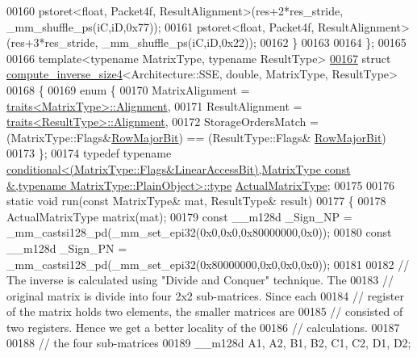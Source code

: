 \begin{DoxyCode}
00160     pstoret<float, Packet4f, ResultAlignment>(res+2*res\_stride, \_mm\_shuffle\_ps(iC,iD,0x77));
00161     pstoret<float, Packet4f, ResultAlignment>(res+3*res\_stride, \_mm\_shuffle\_ps(iC,iD,0x22));
00162   \}
00163 
00164 \};
00165 
00166 \textcolor{keyword}{template}<\textcolor{keyword}{typename} MatrixType, \textcolor{keyword}{typename} ResultType>
\hyperlink{struct_eigen_1_1internal_1_1compute__inverse__size4_3_01_architecture_1_1_s_s_e_00_01double_00_0ae07abd87bb6c7ddc3170cf276579ed0}{00167} \textcolor{keyword}{struct }\hyperlink{struct_eigen_1_1internal_1_1compute__inverse__size4}{compute\_inverse\_size4}<Architecture::SSE, double, MatrixType, ResultType>
00168 \{
00169   \textcolor{keyword}{enum} \{
00170     MatrixAlignment     = \hyperlink{struct_eigen_1_1internal_1_1traits}{traits<MatrixType>::Alignment},
00171     ResultAlignment     = \hyperlink{struct_eigen_1_1internal_1_1traits}{traits<ResultType>::Alignment},
00172     StorageOrdersMatch  = (MatrixType::Flags&\hyperlink{group__flags_gae4f56c2a60bbe4bd2e44c5b19cbe8762}{RowMajorBit}) == (ResultType::Flags&
      \hyperlink{group__flags_gae4f56c2a60bbe4bd2e44c5b19cbe8762}{RowMajorBit})
00173   \};
00174   \textcolor{keyword}{typedef} \textcolor{keyword}{typename} 
      \hyperlink{class_eigen_1_1internal_1_1_tensor_lazy_evaluator_writable}{conditional<(MatrixType::Flags&LinearAccessBit),MatrixType const &,typename MatrixType::PlainObject>::type}
       \hyperlink{class_eigen_1_1internal_1_1_tensor_lazy_evaluator_writable}{ActualMatrixType};
00175   
00176   \textcolor{keyword}{static} \textcolor{keywordtype}{void} run(\textcolor{keyword}{const} MatrixType& mat, ResultType& result)
00177   \{
00178     ActualMatrixType matrix(mat);
00179     \textcolor{keyword}{const} \_\_m128d \_Sign\_NP = \_mm\_castsi128\_pd(\_mm\_set\_epi32(0x0,0x0,0x80000000,0x0));
00180     \textcolor{keyword}{const} \_\_m128d \_Sign\_PN = \_mm\_castsi128\_pd(\_mm\_set\_epi32(0x80000000,0x0,0x0,0x0));
00181 
00182     \textcolor{comment}{// The inverse is calculated using "Divide and Conquer" technique. The}
00183     \textcolor{comment}{// original matrix is divide into four 2x2 sub-matrices. Since each}
00184     \textcolor{comment}{// register of the matrix holds two elements, the smaller matrices are}
00185     \textcolor{comment}{// consisted of two registers. Hence we get a better locality of the}
00186     \textcolor{comment}{// calculations.}
00187 
00188     \textcolor{comment}{// the four sub-matrices}
00189     \_\_m128d A1, A2, B1, B2, C1, C2, D1, D2;

\end{DoxyCode}
